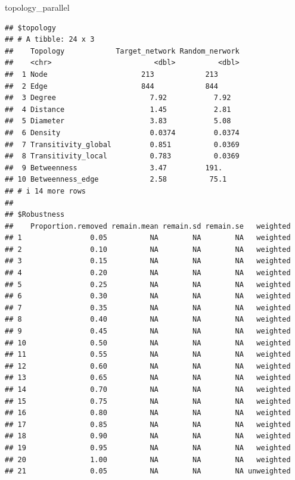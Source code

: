 \documentclass[
]{book}
\newenvironment{Shaded}{\begin{snugshade}}{\end{snugshade}}
\newcommand{\NormalTok}[1]{#1}
\begin{document}
\begin{Shaded}
\begin{Highlighting}[]
\NormalTok{topology\_parallel}
\end{Highlighting}
\end{Shaded}

\begin{verbatim}
## $topology
## # A tibble: 24 x 3
##    Topology            Target_network Random_nerwork
##    <chr>                        <dbl>          <dbl>
##  1 Node                      213            213     
##  2 Edge                      844            844     
##  3 Degree                      7.92           7.92  
##  4 Distance                    1.45           2.81  
##  5 Diameter                    3.83           5.08  
##  6 Density                     0.0374         0.0374
##  7 Transitivity_global         0.851          0.0369
##  8 Transitivity_local          0.783          0.0369
##  9 Betweenness                 3.47         191.    
## 10 Betweenness_edge            2.58          75.1   
## # i 14 more rows
## 
## $Robustness
##    Proportion.removed remain.mean remain.sd remain.se   weighted
## 1                0.05          NA        NA        NA   weighted
## 2                0.10          NA        NA        NA   weighted
## 3                0.15          NA        NA        NA   weighted
## 4                0.20          NA        NA        NA   weighted
## 5                0.25          NA        NA        NA   weighted
## 6                0.30          NA        NA        NA   weighted
## 7                0.35          NA        NA        NA   weighted
## 8                0.40          NA        NA        NA   weighted
## 9                0.45          NA        NA        NA   weighted
## 10               0.50          NA        NA        NA   weighted
## 11               0.55          NA        NA        NA   weighted
## 12               0.60          NA        NA        NA   weighted
## 13               0.65          NA        NA        NA   weighted
## 14               0.70          NA        NA        NA   weighted
## 15               0.75          NA        NA        NA   weighted
## 16               0.80          NA        NA        NA   weighted
## 17               0.85          NA        NA        NA   weighted
## 18               0.90          NA        NA        NA   weighted
## 19               0.95          NA        NA        NA   weighted
## 20               1.00          NA        NA        NA   weighted
## 21               0.05          NA        NA        NA unweighted

\end{verbatim}
\end{document}
